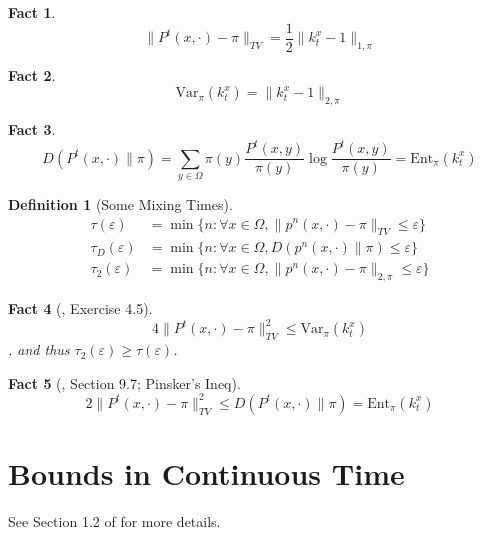 \documentclass{article}
\newtheorem{fact}{Fact}[section]
\newtheorem{define}{Definition}[section]
\begin{document}
\begin{fact}
  \[\parallel P^t(x, \cdot) - \pi \parallel_{TV} = \frac{1}{2}\parallel k^x_t - 1 \parallel_{1,\pi}\]
\end{fact}

\begin{fact}
  \[\mathrm{Var}_\pi(k^x_t) = \parallel k^x_t - 1 \parallel_{2, \pi}\]
\end{fact}

\begin{fact}
  \[D(P^t(x, \cdot) \parallel \pi) =\sum_{y\in \Omega}\pi(y)\frac{P^t(x, y)}{\pi(y)}\log \frac{P^t(x,y)}{\pi(y)} = \mathrm{Ent}_\pi (k^x_t)\]
\end{fact}

\begin{define}[Some Mixing Times]
  \begin{align*}
    \tau(\varepsilon) &= \min\{n: \forall x\in \Omega, \parallel p^n(x,\cdot) - \pi \parallel_{TV} \leq \varepsilon\} \\
    \tau_D(\varepsilon) &= \min\{n: \forall x\in \Omega, D(p^n(x,\cdot) \parallel \pi) \leq \varepsilon\} \\
    \tau_2(\varepsilon) &= \min\{n: \forall x\in \Omega, \parallel p^n(x,\cdot) - \pi \parallel_{2, \pi} \leq \varepsilon\} 
  \end{align*}
\end{define}

\begin{fact}[\cite{levin2017markov}, Exercise 4.5]
  \[4\parallel P^t(x, \cdot) - \pi \parallel_{TV}^2 \leq \mathrm{Var}_\pi(k^x_t)\],
  and thus $\tau_2(\varepsilon) \geq \tau(\varepsilon)$.
\end{fact}

\begin{fact}[\cite{jerrum2005integrating}, Section 9.7; Pinsker's Ineq]
  \[2\parallel P^t(x,\cdot) - \pi \parallel^2_{TV} \leq D(P^t(x, \cdot) \parallel \pi) = \mathrm{Ent}_\pi(k^x_t)\]
\end{fact}

\section{Bounds in Continuous Time}
See Section 1.2 of \cite{montenegro2006mathematical} for more details.

\clearpage


\end{document}
